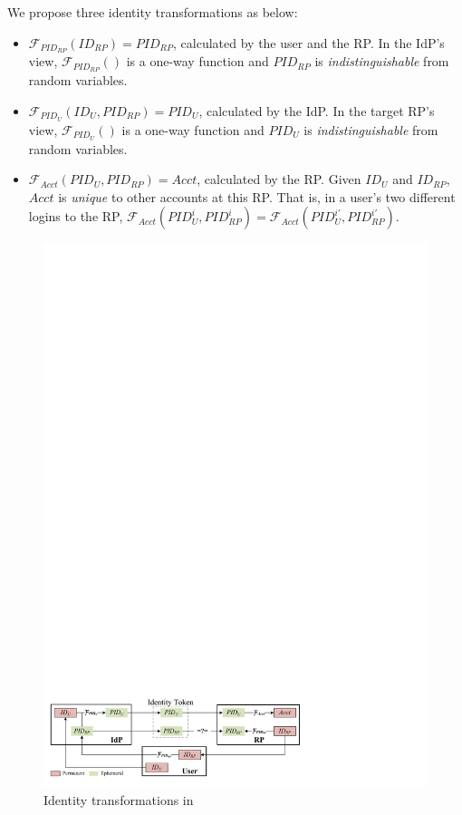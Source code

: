 We propose three identity transformations as below:
\vspace{-\topsep}\begin{itemize}
\setlength{\topsep}{0pt}
\setlength{\partopsep}{0pt}
\setlength{\itemsep}{0pt}
\setlength{\parsep}{0pt}
\setlength{\parskip}{0pt}
\item
$\mathcal{F}_{PID_{RP}}(ID_{RP}) = PID_{RP}$, calculated by the user and the RP.
In the IdP's view,
$\mathcal{F}_{PID_{RP}}()$ is a one-way function and $PID_{RP}$
is \emph{indistinguishable} from random variables.
\item
$\mathcal{F}_{PID_U}(ID_U, PID_{RP}) = PID_{U}$, calculated by the IdP.
In the target RP's view,
    $\mathcal{F}_{PID_U}()$ is a one-way function and $PID_{U}$ is \emph{indistinguishable} from random variables.
\item
$\mathcal{F}_{Acct}(PID_{U}, PID_{RP}) = Acct$, calculated by the RP.
Given $ID_U$ and $ID_{RP}$, $Acct$ is %
\emph{unique} to other accounts at this RP.
That is, in a user's two different logins to the RP,
 $\mathcal{F}_{Acct}(PID_{U}^i, PID_{RP}^i) = \mathcal{F}_{Acct}(PID_{U}^{i'}, PID_{RP}^{i'})$.
\end{itemize}



\begin{figure}[bt]
  \centering
  \includegraphics[width=0.99\linewidth]{fig/IDCorrelation.pdf}
  \caption{Identity transformations in \usso} %
  \label{fig:IDCorrelation}
\end{figure}

